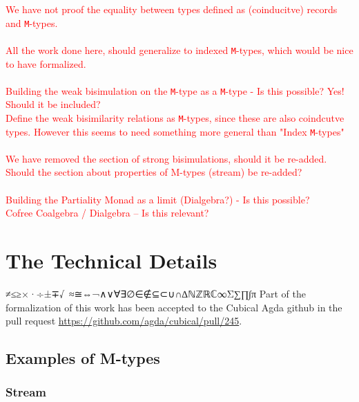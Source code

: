 \documentclass[twoside,11pt,openright]{report}
\theoremstyle{plain} %
\theoremstyle{definition}
\theoremstyle{remark}
\begin{document}
\textcolor{red}{
We have not proof the equality between types defined as (coinducitve) records and \texttt{M}-types.
\\ \\
All the work done here, should generalize to indexed \texttt{M}-types, which would be nice to have formalized.
\\ \\
Building the weak bisimulation on the \texttt{M}-type as a \texttt{M}-type - Is this possible? Yes! Should it be included?
\\
Define the weak bisimilarity relations as \texttt{M}-types, since these are also coindcutve types. However this seems to need something more general than "Index \texttt{M}-types"
\\ \\
We have removed the section of strong bisimulations, should it be re-added. Should the section about properties of M-types (stream) be re-added?
\\ \\
Building the Partiality Monad as a limit (Dialgebra?) - Is this possible?
\\
Cofree Coalgebra / Dialgebra -- Is this relevant? 
}


\cleardoublepage
{}
 



\cleardoublepage
\appendix

\chapter{The Technical Details}
≠≤≥×·÷±∓√\string~≈≅⇔¬∧∨∀∃∅∈∉⊆⊂∪∩∆ℕℤℝℂ∞Σ∑∏∫π
Part of the formalization of this work has been accepted to the Cubical Agda github in the pull request \url{https://github.com/agda/cubical/pull/245}.
\section{Examples of M-types}
\subsection{Stream}

\end{document}
